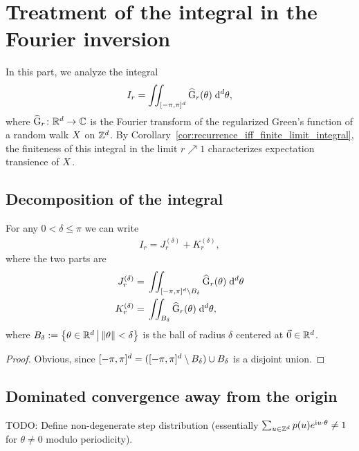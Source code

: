 \chapter{Treatment of the integral in the Fourier inversion}

In this part, we analyze the integral
\begin{align}
I_r = \iint_{[-\pi,\pi]^d} \widehat{\mathrm{G}}_{r} (\theta) \; \mathrm{d}^d \theta ,
\end{align}
where $\widehat{\mathrm{G}}_{r} \colon \mathbb{R}^d \to \mathbb{C}$ is the Fourier transform of the
regularized Green's function of a random walk $X$ on $\mathbb{Z}^d$. By
Corollary~\ref{cor:recurrence_iff_finite_limit_integral}, the finiteness
of this integral in the limit $r \nearrow 1$ characterizes expectation
transience of $X$.

\section{Decomposition of the integral}

\begin{lemma}
  \label{lem:integral_decomposition}
  For any $0 < \delta \le \pi$ we can write
  \begin{align*}
  I_r = J_r^{(\delta)} + K_r^{(\delta)},
  \end{align*}
  where the two parts are
  \begin{align}
  J_r^{(\delta)} = \; & \iint_{[-\pi,\pi]^d \setminus B_\delta} \widehat{\mathrm{G}}_{r} (\theta) \; \mathrm{d}^d \theta \\
  K_r^{(\delta)} = \; & \iint_{B_\delta} \widehat{\mathrm{G}}_{r} (\theta) \; \mathrm{d}^d \theta ,
  \end{align}
  where $B_\delta := \left\{  \theta \in \mathbb{R}^d \, \big| \, \|\theta\| < \delta \right\}$ is the
  ball of radius $\delta$ centered at $\vec{0} \in \mathbb{R}^d$.
\end{lemma}
\begin{proof}
Obvious, since $[-\pi,\pi]^d = ([-\pi,\pi]^d \setminus B_\delta) \cup B_\delta$
is a disjoint union.
\end{proof}


\section{Dominated convergence away from the origin}

TODO: Define non-degenerate step distribution (essentially $\sum_{u\in \mathbb{Z}^d} p(u) e^{\mathrm{i} u \cdot \theta} \ne 1$ for $\theta \ne 0$ modulo periodicity).

